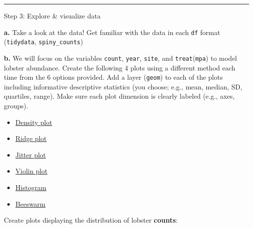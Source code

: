\documentclass[
]{article}
\providecommand{\tightlist}{%
  \setlength{\itemsep}{0pt}\setlength{\parskip}{0pt}}
\begin{document}
\begin{center}\rule{0.5\linewidth}{0.5pt}\end{center}

Step 3: Explore \& visualize data

\textbf{a.} Take a look at the data! Get familiar with the data in each
\texttt{df} format (\texttt{tidydata}, \texttt{spiny\_counts})

\textbf{b.} We will focus on the variables \texttt{count},
\texttt{year}, \texttt{site}, and \texttt{treat}(\texttt{mpa}) to model
lobster abundance. Create the following 4 plots using a different method
each time from the 6 options provided. Add a layer (\texttt{geom}) to
each of the plots including informative descriptive statistics (you
choose; e.g., mean, median, SD, quartiles, range). Make sure each plot
dimension is clearly labeled (e.g., axes, groups).

\begin{itemize}
\tightlist
\item
  \href{https://r-charts.com/distribution/density-plot-group-ggplot2}{Density
  plot}
\item
  \href{https://r-charts.com/distribution/ggridges/}{Ridge plot}
\item
  \href{https://ggplot2.tidyverse.org/reference/geom_jitter.html}{Jitter
  plot}
\item
  \href{https://r-charts.com/distribution/violin-plot-group-ggplot2}{Violin
  plot}
\item
  \href{https://r-charts.com/distribution/histogram-density-ggplot2/}{Histogram}
\item
  \href{https://r-charts.com/distribution/beeswarm/}{Beeswarm}
\end{itemize}

Create plots displaying the distribution of lobster \textbf{counts}:
\end{document}
